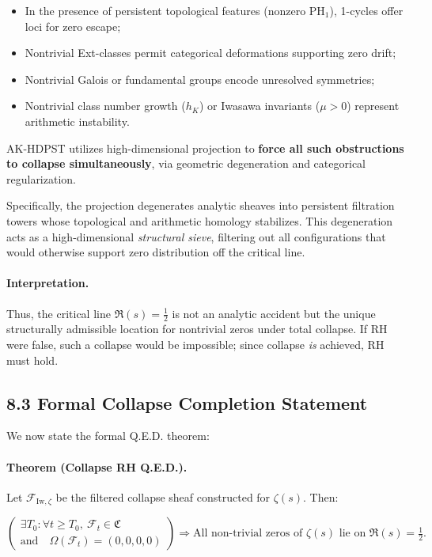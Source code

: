 \documentclass[11pt]{article}
\begin{document}
\begin{itemize}
  \item In the presence of persistent topological features (nonzero \( \mathrm{PH}_1 \)), 1-cycles offer loci for zero escape;
  \item Nontrivial Ext-classes permit categorical deformations supporting zero drift;
  \item Nontrivial Galois or fundamental groups encode unresolved symmetries;
  \item Nontrivial class number growth (\( h_K \)) or Iwasawa invariants (\( \mu > 0 \)) represent arithmetic instability.
\end{itemize}

\noindent
AK-HDPST utilizes high-dimensional projection to \textbf{force all such obstructions to collapse simultaneously}, via geometric degeneration and categorical regularization.

Specifically, the projection degenerates analytic sheaves into persistent filtration towers whose topological and arithmetic homology stabilizes. This degeneration acts as a high-dimensional \emph{structural sieve}, filtering out all configurations that would otherwise support zero distribution off the critical line.

\paragraph{Interpretation.}

Thus, the critical line \( \Re(s) = \tfrac{1}{2} \) is not an analytic accident but the unique structurally admissible location for nontrivial zeros under total collapse. If RH were false, such a collapse would be impossible; since collapse \emph{is} achieved, RH must hold.

\subsection*{8.3 Formal Collapse Completion Statement}

We now state the formal Q.E.D. theorem:

\paragraph{Theorem (Collapse RH Q.E.D.).}
Let \( \mathcal{F}_{\mathrm{Iw},\zeta} \) be the filtered collapse sheaf constructed for \( \zeta(s) \). Then:

\[
\boxed{
\left(
\begin{array}{l}
\exists T_0: \forall t \geq T_0,\ \mathcal{F}_t \in \mathfrak{C} \\
\text{and}\quad \Omega(\mathcal{F}_t) = (0,0,0,0)
\end{array}
\right)
\Rightarrow \text{All non-trivial zeros of } \zeta(s) \text{ lie on } \Re(s) = \tfrac{1}{2}.
}
\]
\end{document}
